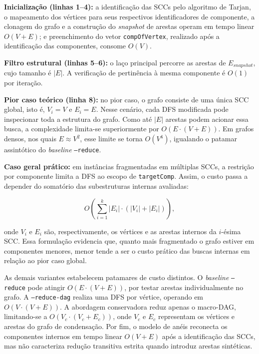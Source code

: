 \documentclass{sbc2023}%
\begin{document}
\textbf{Inicialização (linhas 1--4):} a identificação das SCCs pelo algoritmo de Tarjan, o mapeamento dos vértices para seus respectivos identificadores de componente, a clonagem do grafo e a construção do \textit{snapshot} de arestas operam em tempo linear $O(V + E)$; e preenchimento do vetor \texttt{compOfVertex}, realizado após a identificação das componentes, consome $O(V)$.

\textbf{Filtro estrutural (linhas 5--6):}  o laço principal percorre as
arestas de $E_{snapshot}$, cujo tamanho é $|E|$. A verificação
de pertinência à mesma componente é $O(1)$ por iteração.

\textbf{Pior caso teórico (linha 8):} no pior caso, o grafo consiste de uma única SCC global, isto é, $V_i = V$ e $E_i = E$. Nesse cenário, cada DFS modificada pode inspecionar toda a estrutura do grafo. Como até $|E|$ arestas podem acionar essa busca, a complexidade limita-se superiormente por $O(E \cdot (V + E))$. Em grafos densos, nos quais $E \approx V^2$, esse limite se torna $O(V^4)$, igualando o patamar assintótico do \textit{baseline} \texttt{--reduce}.

\textbf{Caso geral prático:} em instâncias fragmentadas em múltiplas SCCs, a restrição por componente limita a DFS ao escopo de \texttt{targetComp}. Assim, o custo passa a depender do somatório das subestruturas internas avaliadas:

\begin{equation}
O\left(\sum_{i=1}^{k} |E_i| \cdot (|V_i| + |E_i|)\right),
\end{equation}

onde $V_i$ e $E_i$ são, respectivamente, os vértices e as arestas internos da $i$-ésima SCC. Essa formulação evidencia que, quanto mais fragmentado o grafo estiver em componentes menores, menor tende a ser o custo prático das buscas internas em relação ao pior caso global.

As demais variantes estabelecem patamares de custo distintos. O \textit{baseline} \texttt{--reduce} pode atingir $O(E \cdot (V + E))$, por testar arestas individualmente no grafo. A \texttt{--reduce-dag} realiza uma DFS por vértice, operando em $O(V \cdot (V + E))$. A abordagem conservadora reduz apenas o macro-DAG, limitando-se a $O(V_c \cdot (V_c + E_c))$, onde $V_c$ e $E_c$ representam os vértices e arestas do grafo de condensação. Por fim, o modelo de anéis reconecta os componentes internos em tempo linear $O(V + E)$ após a identificação das SCCs, mas não caracteriza redução transitiva estrita quando introduz arestas sintéticas.
\end{document}
